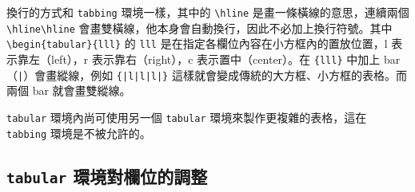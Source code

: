 換行的方式和 \texttt{tabbing} 環境一樣，其中的 \verb|\hline| 是畫一條橫線的意思，連續兩個 \verb|\hline\hline| 會畫雙橫線，他本身會自動換行，因此不必加上換行符號。其中 \verb|\begin{tabular}{lll}| 的 \texttt{lll} 是在指定各欄位內容在小方框內的置放位置，{\ttfamily l} 表示靠左（left），{\ttfamily r} 表示靠右（right），{\ttfamily c} 表示置中（center）。在 \verb|{lll}| 中加上 bar（\verb+|+）會畫縱線，例如 \verb+{|l|l|l|}+ 這樣就會變成傳統的大方框、小方框的表格。而兩個 bar 就會畫雙縱線。

\texttt{tabular} 環境內尚可使用另一個 \texttt{tabular} 環境來製作更複雜的表格，這在 \texttt{tabbing} 環境是不被允許的。

\subsection{\texttt{tabular} 環境對欄位的調整}

